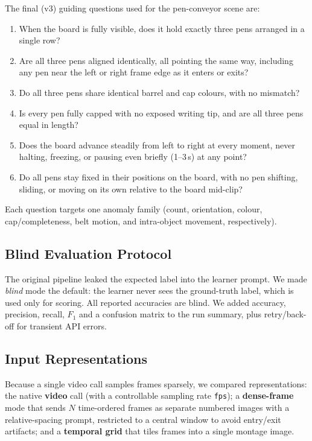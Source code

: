 The final (v3) guiding questions used for the pen-conveyor scene are:
\begin{enumerate}
  \item When the board is fully visible, does it hold exactly three pens arranged in a
        single row?
  \item Are all three pens aligned identically, all pointing the same way, including any
        pen near the left or right frame edge as it enters or exits?
  \item Do all three pens share identical barrel and cap colours, with no mismatch?
  \item Is every pen fully capped with no exposed writing tip, and are all three pens
        equal in length?
  \item Does the board advance steadily from left to right at every moment, never
        halting, freezing, or pausing even briefly (1--3\,s) at any point?
  \item Do all pens stay fixed in their positions on the board, with no pen shifting,
        sliding, or moving on its own relative to the board mid-clip?
\end{enumerate}
Each question targets one anomaly family (count, orientation, colour, cap/completeness,
belt motion, and intra-object movement, respectively).

\subsection{Blind Evaluation Protocol}
The original pipeline leaked the expected label into the learner prompt. We made
\emph{blind} mode the default: the learner never sees the ground-truth label, which is
used only for scoring. All reported accuracies are blind. We added accuracy, precision,
recall, $F_1$ and a confusion matrix to the run summary, plus retry/back-off for
transient API errors.

\subsection{Input Representations}
Because a single video call samples frames sparsely, we compared representations:
the native \textbf{video} call (with a controllable sampling rate \texttt{fps}); a
\textbf{dense-frame} mode that sends $N$ time-ordered frames as separate numbered images
with a relative-spacing prompt, restricted to a central window to avoid entry/exit
artifacts; and a \textbf{temporal grid} that tiles frames into a single montage image.

